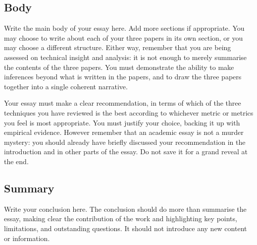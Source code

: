 \documentclass{scrartcl}
\begin{document}
\subsection{Body}
Write the main body of your essay here. Add more sections if appropriate. You may choose to write about each of your three papers in its own section, or you may choose a different structure. Either way, remember that you are being assessed on technical insight and analysis: it is not enough to merely summarise the contents of the three papers. You must demonstrate the ability to make inferences beyond what is written in the papers, and to draw the three papers together into a single coherent narrative.

Your essay must make a clear recommendation, in terms of which of the three techniques you have reviewed is the best according to whichever metric or metrics you feel is most appropriate. You must justify your choice, backing it up with empirical evidence. However remember that an academic essay is not a murder mystery: you should already have briefly discussed your recommendation in the introduction and in other parts of the essay. Do not save it for a grand reveal at the end.

\subsection{Summary}
Write your conclusion here. The conclusion should do more than summarise the essay, making clear the contribution of the work and highlighting key points, limitations, and outstanding questions. It should not introduce any new content or information.



\end{document}
